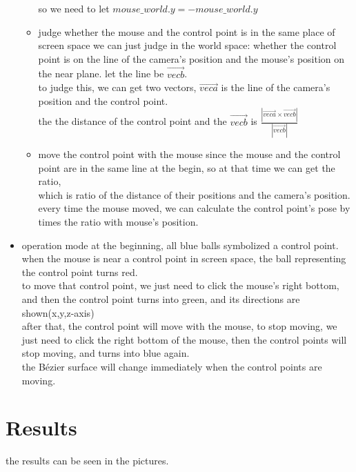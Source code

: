 \documentclass[acmtog]{acmart}
\begin{document}
\begin{itemize}
\begin{itemize}
		so we need to let $mouse\_world.y = -mouse\_world.y$
		\item judge whether the mouse and the control point is in the same place of screen space
		we can just judge in the world space: whether the control point is on the line of the camera's position and the mouse's position on the near plane. let the line be $\vec{vecb}$.\\	
		to judge this, we can get two vectors, $\vec{veca}$ is the line of the camera's position and the control point.\\
		the the distance of the control point and the $\vec{vecb}$ is $\frac{\left| \vec{veca} \times \vec{vecb} \right|}{\left| \vec{vecb} \right|}$
		\item move the control point with the mouse
		since the mouse and the control point are in the same line at the begin, so at that time we can get the ratio,\\
		which is ratio of the distance of their positions and the camera's position.
		every time the mouse moved, we can calculate the control point's pose by times the ratio with mouse's position.
	\end{itemize}


	\item operation mode
	at the beginning, all blue balls symbolized a control point.\\ 
	when the mouse is near a control point in screen space, the ball representing the control point turns red.\\
	to move that control point, we just need to click the mouse's right bottom, and then the control point turns into green, and its directions are shown(x,y,z-axis)\\
	after that, the control point will move with the mouse, to stop moving, we just need to click the right bottom of the mouse,
	then the control points will stop moving, and turns into blue again.\\
	the Bézier surface will change immediately when the control points are moving.
\end{itemize}


\section{Results}
the results can be seen in the pictures.
\end{document}
